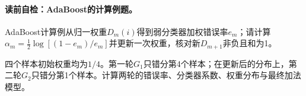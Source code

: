 \paragraph{读前自检：AdaBoost的计算例题。}AdaBoost计算例从归一权重$D_m(i)$得到弱分类器加权错误率$e_m$；请计算$\alpha_m=\tfrac12\log[(1-e_m)/e_m]$并更新一次权重，核对新$D_{m+1}$非负且和为1。\par

\label{struct:V3-C03-CH26}
\begin{example}[两轮AdaBoost的完整计算]\label{exm:V3-C03-two-round}
四个样本初始权重均为$1/4$。第一轮$G_1$只错分第4个样本；在更新后的分布上，第二轮$G_2$只错分第1个样本。计算两轮的错误率、分类器系数、权重分布与最终加法模型。
\end{example}
